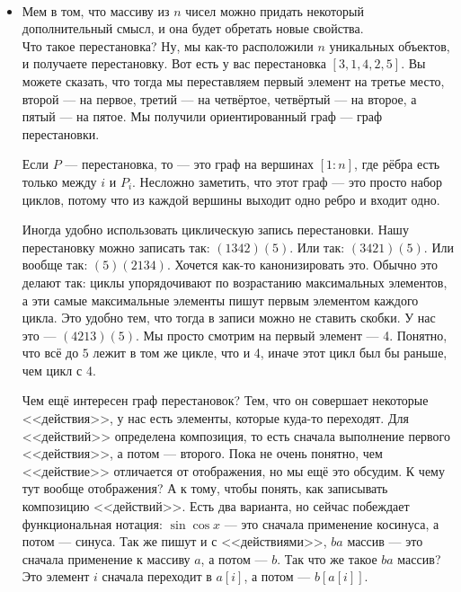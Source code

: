 \documentclass{article}
\begin{document}
    \paragraph{}
    \begin{itemize}
        \item[]
        \begin{Comment}
            Мем в том, что массиву из $n$ чисел можно придать некоторый дополнительный смысл, и она будет обретать новые свойства.\\
            Что такое перестановка? Ну, мы как-то расположили $n$ уникальных объектов, и получаете перестановку. Вот есть у вас перестановка $[3,1,4,2,5]$. Вы можете сказать, что тогда мы переставляем первый элемент на третье место, второй --- на первое, третий --- на четвёртое, четвёртый --- на второе, а пятый --- на пятое. Мы получили ориентированный граф --- граф перестановки.
        \end{Comment}
        \dfn Если $P$ --- перестановка, то  --- это граф на вершинах $[1:n]$, где рёбра есть только между $i$ и $P_i$.
        \thm Несложно заметить, что этот граф --- это просто набор циклов, потому что из каждой вершины выходит одно ребро и входит одно.
        \begin{Comment}
            Иногда удобно использовать циклическую запись перестановки. Нашу перестановку можно записать так: $(1342)(5)$. Или так: $(3421)(5)$. Или вообще так: $(5)(2134)$. Хочется как-то канонизировать это. Обычно это делают так: циклы упорядочивают по возрастанию максимальных элементов, а эти самые максимальные элементы пишут первым элементом каждого цикла. Это удобно тем, что тогда в записи можно не ставить скобки. У нас это --- $(4213)(5)$. Мы просто смотрим на первый элемент --- 4. Понятно, что всё до $5$ лежит в том же цикле, что и 4, иначе этот цикл был бы раньше, чем цикл с 4.
        \end{Comment}
        \begin{Comment}
            Чем ещё интересен граф перестановок? Тем, что он совершает некоторые <<действия>>, у нас есть элементы, которые куда-то переходят. Для <<действий>> определена композиция, то есть сначала выполнение первого <<действия>>, а потом --- второго. Пока не очень понятно, чем <<действие>> отличается от отображения, но мы ещё это обсудим. К чему тут вообще отображения? А к тому, чтобы понять, как записывать композицию <<действий>>. Есть два варианта, но сейчас побеждает функциональная нотация: $\sin\cos x$ --- это сначала применение косинуса, а потом --- синуса. Так же пишут и с <<действиями>>, $ba\text{ массив}$ --- это сначала применение к массиву $a$, а потом --- $b$. Так что же такое $ba\text{ массив}$? Это элемент $i$ сначала переходит в $a[i]$, а потом --- $b[a[i]]$.

\end{Comment}
\end{itemize}
\end{document}

